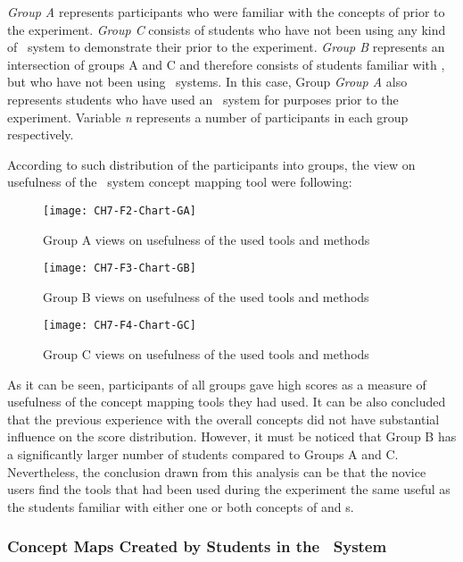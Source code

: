 \FloatBarrier

\textit{Group A} represents participants who were familiar with the concepts of
\LLLs prior to the experiment. \textit{Group C} consists of students who have
not been using any kind of \ep~system to demonstrate their \LLLs prior to the
experiment. \textit{Group B} represents an intersection of groups A and C and
therefore consists of students familiar with \LLLsn, but who have not been using
\ep~systems. In this case, Group \textit{Group A} also represents students who
have used an \ep~system for \LLLs purposes prior to the experiment. Variable
\textit{n} represents a number of participants in each group respectively.

According to such distribution of the participants into groups, the view on
usefulness of the \ep~system concept mapping tool were following:

\begin{figure}[htb]
\centering
\texttt{[image: CH7-F2-Chart-GA]}
\caption{Group A views on usefulness of the used tools and methods}
\label{fig:group1}
\end{figure}

\begin{figure}[htb]
\centering
\texttt{[image: CH7-F3-Chart-GB]}
\caption{Group B views on usefulness of the used tools and methods}
\label{fig:group2}
\end{figure}

\begin{figure}[htb]
\centering
\texttt{[image: CH7-F4-Chart-GC]}
\caption{Group C views on usefulness of the used tools and methods}
\label{fig:group3}
\end{figure}

\FloatBarrier

As it can be seen, participants of all groups gave high scores as a measure of
usefulness of the concept mapping tools they had used. It can be also concluded
that the previous experience with the overall concepts did not have substantial
influence on the score distribution. However, it must be noticed that Group B
has a significantly larger number of students compared to Groups A and C.
Nevertheless, the conclusion drawn from this analysis can be that the novice
users find the tools that had been used during the experiment the same useful
as the students familiar with either one or both concepts of \LLLs and \ep s.

\subsubsection{Concept Maps Created by Students in the \ep~System}



